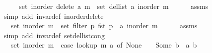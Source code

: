 \begin{isabellebody}
%
\isadelimproof
%
\endisadelimproof
%
\isatagproof
{}\isamarkupfalse%
\ {\isacharminus}{\kern0pt}\isanewline
\ \ \isamarkupfalse%
\ {\isachardoublequoteopen}set\ {\isacharparenleft}{\kern0pt}inorder\ {\isacharparenleft}{\kern0pt}delete\ a\ m{\isacharparenright}{\kern0pt}{\isacharparenright}{\kern0pt}\ {\isacharequal}{\kern0pt}\ set\ {\isacharparenleft}{\kern0pt}del{\isacharunderscore}{\kern0pt}list\ a\ {\isacharparenleft}{\kern0pt}inorder\ m{\isacharparenright}{\kern0pt}{\isacharparenright}{\kern0pt}{\isachardoublequoteclose}\isanewline
\ \ \ \ \isamarkupfalse%
\ assms\isanewline
\ \ \ \ \isamarkupfalse%
\ {\isacharparenleft}{\kern0pt}simp\ add{\isacharcolon}{\kern0pt}\ invar{\isacharunderscore}{\kern0pt}def\ inorder{\isacharunderscore}{\kern0pt}delete{\isacharparenright}{\kern0pt}\isanewline
\ \ \isamarkupfalse%
\ \isamarkupfalse%
\ {\isachardoublequoteopen}{\isachardot}{\kern0pt}{\isachardot}{\kern0pt}{\isachardot}{\kern0pt}\ {\isacharequal}{\kern0pt}\ set\ {\isacharparenleft}{\kern0pt}inorder\ m{\isacharparenright}{\kern0pt}\ {\isacharminus}{\kern0pt}\ set\ {\isacharparenleft}{\kern0pt}filter\ {\isacharparenleft}{\kern0pt}{\isasymlambda}p{\isachardot}{\kern0pt}\ fst\ p\ {\isacharequal}{\kern0pt}\ a{\isacharparenright}{\kern0pt}\ {\isacharparenleft}{\kern0pt}inorder\ m{\isacharparenright}{\kern0pt}{\isacharparenright}{\kern0pt}{\isachardoublequoteclose}\isanewline
\ \ \ \ \isamarkupfalse%
\ assms\isanewline
\ \ \ \ \isamarkupfalse%
\ {\isacharparenleft}{\kern0pt}simp\ add{\isacharcolon}{\kern0pt}\ invar{\isacharunderscore}{\kern0pt}def\ set{\isacharunderscore}{\kern0pt}del{\isacharunderscore}{\kern0pt}list{\isacharunderscore}{\kern0pt}cong{\isacharparenright}{\kern0pt}\isanewline
\ \ \isamarkupfalse%
\ \isamarkupfalse%
\ {\isachardoublequoteopen}{\isachardot}{\kern0pt}{\isachardot}{\kern0pt}{\isachardot}{\kern0pt}\ {\isacharequal}{\kern0pt}\ set\ {\isacharparenleft}{\kern0pt}inorder\ m{\isacharparenright}{\kern0pt}\ {\isacharminus}{\kern0pt}\ {\isacharparenleft}{\kern0pt}case\ lookup\ m\ a\ of\ None\ {\isasymRightarrow}\ {\isacharbraceleft}{\kern0pt}{\isacharbraceright}{\kern0pt}\ {\isacharbar}{\kern0pt}\ Some\ b\ {\isasymRightarrow}\ {\isacharbraceleft}{\kern0pt}{\isacharparenleft}{\kern0pt}a{\isacharcomma}{\kern0pt}\ b{\isacharparenright}{\kern0pt}{\isacharbraceright}{\kern0pt}{\isacharparenright}{\kern0pt}{\isachardoublequoteclose}\isanewline
\ \ \ \ \isamarkupfalse%

\end{isabellebody}
